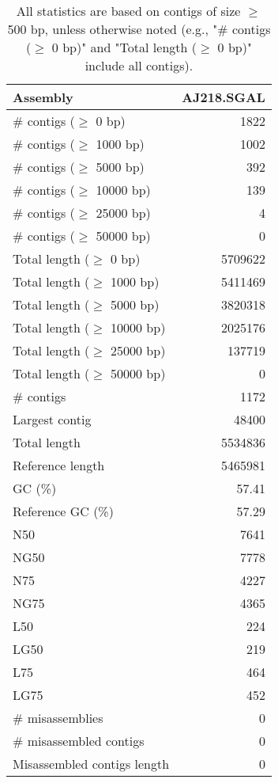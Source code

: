 \documentclass[12pt,a4paper]{article}
\begin{document}
\begin{table}[ht]
\begin{center}
\caption{All statistics are based on contigs of size $\geq$ 500 bp, unless otherwise noted (e.g., "\# contigs ($\geq$ 0 bp)" and "Total length ($\geq$ 0 bp)" include all contigs).}
\begin{tabular}{|l*{1}{|r}|}
\hline
Assembly & AJ218.SGAL \\ \hline
\# contigs ($\geq$ 0 bp) & 1822 \\ \hline
\# contigs ($\geq$ 1000 bp) & 1002 \\ \hline
\# contigs ($\geq$ 5000 bp) & 392 \\ \hline
\# contigs ($\geq$ 10000 bp) & 139 \\ \hline
\# contigs ($\geq$ 25000 bp) & 4 \\ \hline
\# contigs ($\geq$ 50000 bp) & 0 \\ \hline
Total length ($\geq$ 0 bp) & 5709622 \\ \hline
Total length ($\geq$ 1000 bp) & 5411469 \\ \hline
Total length ($\geq$ 5000 bp) & 3820318 \\ \hline
Total length ($\geq$ 10000 bp) & 2025176 \\ \hline
Total length ($\geq$ 25000 bp) & 137719 \\ \hline
Total length ($\geq$ 50000 bp) & 0 \\ \hline
\# contigs & 1172 \\ \hline
Largest contig & 48400 \\ \hline
Total length & 5534836 \\ \hline
Reference length & 5465981 \\ \hline
GC (\%) & 57.41 \\ \hline
Reference GC (\%) & 57.29 \\ \hline
N50 & 7641 \\ \hline
NG50 & 7778 \\ \hline
N75 & 4227 \\ \hline
NG75 & 4365 \\ \hline
L50 & 224 \\ \hline
LG50 & 219 \\ \hline
L75 & 464 \\ \hline
LG75 & 452 \\ \hline
\# misassemblies & 0 \\ \hline
\# misassembled contigs & 0 \\ \hline
Misassembled contigs length & 0 \\ \hline

\end{tabular}
\end{center}
\end{table}
\end{document}
